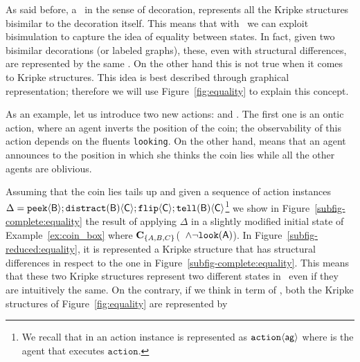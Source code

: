 	As said before, a \pos\ in the sense of decoration, represents all the Kripke structures bisimilar to the decoration itself.
	This means that with \posS\ we can exploit bisimulation to capture the idea of equality between states.
	In fact, given two bisimilar decorations (or labeled graphs), these, even with structural differences, are represented by the same \pos.
	On the other hand this is not true when it comes to Kripke structures.
	This idea is best described through  graphical representation; therefore we will use Figure~\ref{fig:equality} to explain this concept.
	
	As an example, let us introduce two  new actions: \flip{} and .
	The first one is an ontic action, where an agent inverts the position of the coin; the observability of this action depends on the fluents \texttt{looking}.
	On the other hand,  means that an agent announces to  the position in which she thinks the coin lies while all the other agents are oblivious.
	
	Assuming that the coin lies tails up and given a sequence of action instances $\Delta = \peek{B};\distract{B}{C};\flip{C};\tell{B}{C}$\footnote{We recall that in \cite{baral2015action} an action instance is represented as $\mathtt{action}\tuple{\agent{ag}}$ where  is the agent that executes $\mathtt{action}$.} we show in Figure~\ref{subfig-complete:equality} the result of applying $\Delta$ in a slightly modified initial state of Example~\ref{ex:coin_box} where $\textbf{C}_{\{A,B,C\}}$(\opened\ $\wedge \neg \looking{A}$).
	In Figure~\ref{subfig-reduced:equality}, it is represented a Kripke structure that has structural differences in respect to the one in Figure~\ref{subfig-complete:equality}. This means that these two Kripke structures represent two different states in \mAL\ even if they are intuitively the same.
	On the contrary, if we think in term of \posS, both the Kripke structures of Figure~\ref{fig:equality} are represented by \pos\ 
	
